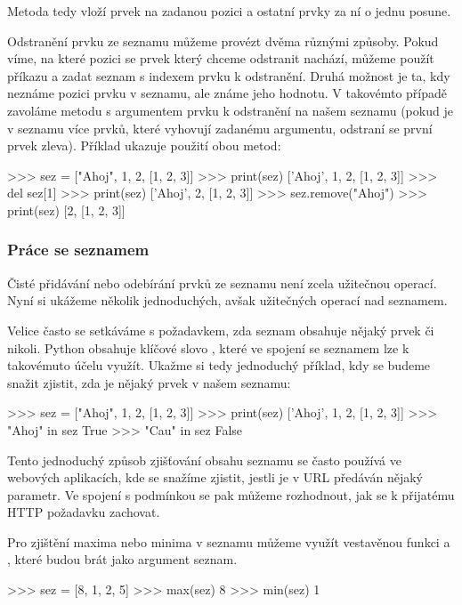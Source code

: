 Metoda  tedy vloží prvek na zadanou pozici a ostatní prvky za ní o jednu posune.

Odstranění prvku ze seznamu můžeme provézt dvěma různými způsoby. Pokud víme, na které pozici se prvek který chceme odstranit nachází, můžeme použít příkazu  a zadat seznam s indexem prvku k odstranění. Druhá možnost je ta, kdy neznáme pozici prvku v seznamu, ale známe jeho hodnotu. V takovémto případě zavoláme metodu  s argumentem prvku k odstranění na našem seznamu (pokud je v seznamu více prvků, které vyhovují zadanému argumentu, odstraní se první prvek zleva). Příklad ukazuje použití obou metod:

\begin{python}
>>> sez = ["Ahoj", 1, 2, [1, 2, 3]]
>>> print(sez)
['Ahoj', 1, 2, [1, 2, 3]]
>>> del sez[1]
>>> print(sez)
['Ahoj', 2, [1, 2, 3]]
>>> sez.remove("Ahoj")
>>> print(sez)
[2, [1, 2, 3]]
\end{python}

\subsubsection{Práce se seznamem}
Čisté přidávání nebo odebírání prvků ze seznamu není zcela užitečnou operací. Nyní si ukážeme několik jednoduchých, avšak užitečných operací nad seznamem.

Velice často se setkáváme s požadavkem, zda seznam obsahuje nějaký prvek či nikoli. Python obsahuje klíčové slovo , které ve spojení se seznamem lze k takovémuto účelu využít. Ukažme si tedy jednoduchý pří\-kla\-d, kdy se budeme snažit zjistit, zda je nějaký prvek v našem seznamu:

\begin{python}
>>> sez = ["Ahoj", 1, 2, [1, 2, 3]]
>>> print(sez)
['Ahoj', 1, 2, [1, 2, 3]]
>>> "Ahoj" in sez
True
>>> "Cau" in sez
False
\end{python}

Tento jednoduchý způsob zjišťování obsahu seznamu se často používá ve webových aplikacích, kde se snažíme zjistit, jestli je v URL předáván nějaký parametr. Ve spojení s podmínkou  se pak můžeme rozhodnout, jak se k přijatému HTTP požadavku zachovat.

Pro zjištění maxima nebo minima v seznamu můžeme využít vestavěnou funkci  a , které budou brát jako argument seznam.

\begin{python}
>>> sez = [8, 1, 2, 5]
>>> max(sez)
8
>>> min(sez)
1
\end{python}


